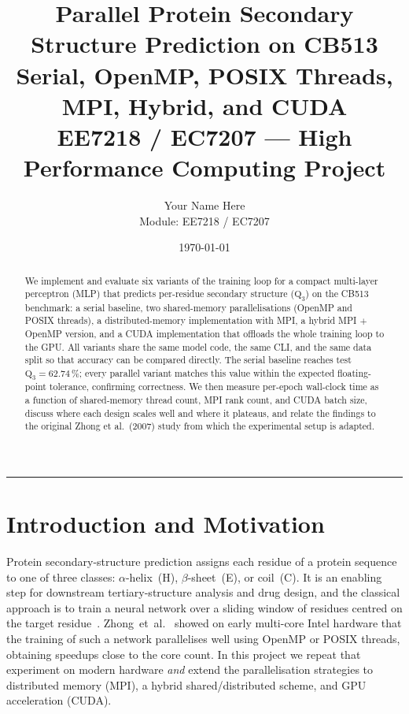 \documentclass[11pt,a4paper]{article}
\title{\bfseries Parallel Protein Secondary Structure Prediction on CB513\\
       \large Serial, OpenMP, POSIX Threads, MPI, Hybrid, and CUDA\\
       \normalsize EE7218 / EC7207 — High Performance Computing Project}
\author{Your Name Here \\ \small Module: EE7218 / EC7207}
\date{\today}
\begin{document}
\maketitle

\begin{abstract}
We implement and evaluate six variants of the training loop for a compact
multi-layer perceptron (MLP) that predicts per-residue secondary structure
($\mathrm{Q}_3$) on the CB513 benchmark: a serial baseline, two shared-memory
parallelisations (OpenMP and POSIX threads), a distributed-memory
implementation with MPI, a hybrid MPI $+$ OpenMP version, and a CUDA
implementation that offloads the whole training loop to the GPU. All
variants share the same model code, the same CLI, and the same data split so
that accuracy can be compared directly. The serial baseline reaches
test $\mathrm{Q}_3 = 62.74\,\%$; every parallel variant matches this value
within the expected floating-point tolerance, confirming correctness. We
then measure per-epoch wall-clock time as a function of shared-memory thread
count, MPI rank count, and CUDA batch size, discuss where each design
scales well and where it plateaus, and relate the findings to the original
Zhong et al.\ (2007) study from which the experimental setup is adapted.
\end{abstract}

\tableofcontents
\bigskip
\hrule
\bigskip

\section{Introduction and Motivation}\label{sec:intro}

Protein secondary-structure prediction assigns each residue of a protein
sequence to one of three classes: $\alpha$-helix~(H), $\beta$-sheet~(E), or
coil~(C). It is an enabling step for downstream tertiary-structure analysis
and drug design, and the classical approach is to train a neural network
over a sliding window of residues centred on the target
residue~\cite{rost1993,zhong2007}. Zhong~et~al.~\cite{zhong2007} showed on
early multi-core Intel hardware that the training of such a network
parallelises well using OpenMP or POSIX threads, obtaining speedups close
to the core count. In this project we repeat that experiment on modern
hardware \emph{and} extend the parallelisation strategies to distributed
memory (MPI), a hybrid shared/distributed scheme, and GPU acceleration
(CUDA).
\end{document}
